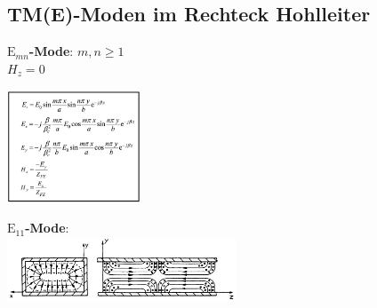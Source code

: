 \documentclass[english]{latex4ei/latex4ei_sheet}
\begin{document}
\begin{sectionbox}
	\subsection{TM(E)-Moden im Rechteck Hohlleiter}
	\textbf{$\text{E}_{mn}$-Mode}: $m,n \geq 1$\\
	$H_z = 0$
	\begin{center}\includegraphics[width = 4cm]{./img/Emn.png}\end{center}

	\textbf{$\text{E}_{11}$-Mode}:\\
	\includegraphics[width = 6.8cm]{./img/E11-bild1.png}
\end{sectionbox}
\end{document}
